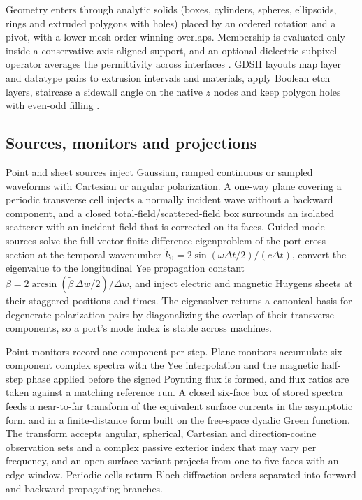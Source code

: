 \documentclass[11pt,a4paper]{article}
\begin{document}
Geometry enters through analytic solids (boxes, cylinders, spheres, ellipsoids, rings and extruded polygons with holes) placed by an ordered rotation and a pivot, with a lower mesh order winning overlaps. Membership is evaluated only inside a conservative axis-aligned support, and an optional dielectric subpixel operator averages the permittivity across interfaces \citep{farjadpour2006}. GDSII layouts map layer and datatype pairs to extrusion intervals and materials, apply Boolean etch layers, staircase a sidewall angle on the native $z$ nodes and keep polygon holes with even-odd filling \citep{gdstk}.

\subsection{Sources, monitors and projections}

Point and sheet sources inject Gaussian, ramped continuous or sampled waveforms with Cartesian or angular polarization. A one-way plane covering a periodic transverse cell injects a normally incident wave without a backward component, and a closed total-field/scattered-field box \citep{schneider2010} surrounds an isolated scatterer with an incident field that is corrected on its faces. Guided-mode sources solve the full-vector finite-difference eigenproblem of the port cross-section \citep{zhu2002} at the temporal wavenumber $\tilde k_0=2\sin(\omega\Delta t/2)/(c\Delta t)$, convert the eigenvalue to the longitudinal Yee propagation constant $\beta=2\arcsin(\tilde\beta\,\Delta w/2)/\Delta w$, and inject electric and magnetic Huygens sheets at their staggered positions and times. The eigensolver returns a canonical basis for degenerate polarization pairs by diagonalizing the overlap of their transverse components, so a port's mode index is stable across machines.

Point monitors record one component per step. Plane monitors accumulate six-component complex spectra with the Yee interpolation and the magnetic half-step phase applied before the signed Poynting flux is formed, and flux ratios are taken against a matching reference run. A closed six-face box of stored spectra feeds a near-to-far transform of the equivalent surface currents \citep{luebbers1991} in the asymptotic form and in a finite-distance form built on the free-space dyadic Green function. The transform accepts angular, spherical, Cartesian and direction-cosine observation sets and a complex passive exterior index that may vary per frequency, and an open-surface variant projects from one to five faces with an edge window. Periodic cells return Bloch diffraction orders separated into forward and backward propagating branches.
\end{document}

